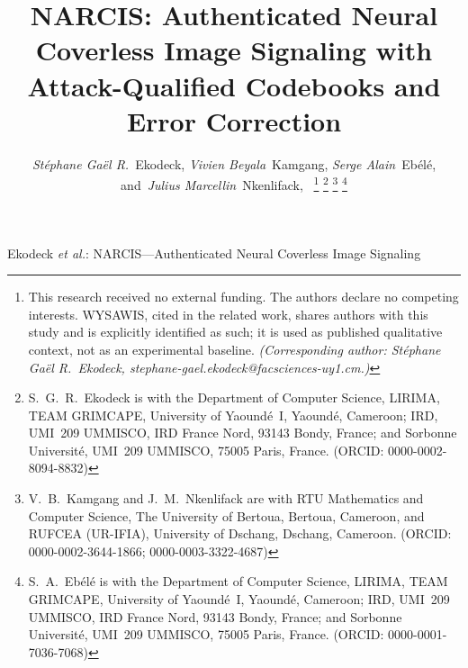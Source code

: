 ﻿\documentclass[10pt,journal]{IEEEtran}
\begin{document}
\title{NARCIS: Authenticated Neural Coverless Image Signaling
  with Attack-Qualified Codebooks and Error Correction}

\author{\emph{St\'{e}phane Ga\"{e}l R.}~Ekodeck,
        \emph{Vivien Beyala}~Kamgang,
        \emph{Serge Alain}~Eb\'{e}l\'{e},
        and~\emph{Julius Marcellin}~Nkenlifack,~
\thanks{This research received no external funding. The authors declare no
  competing interests. WYSAWIS, cited in the related work, shares authors
  with this study and is explicitly identified as such; it is used as
  published qualitative context, not as an experimental baseline.
  \emph{(Corresponding author: St\'ephane Ga\"el R.~Ekodeck,
  stephane-gael.ekodeck@facsciences-uy1.cm.)}}
\thanks{S.~G.~R.~Ekodeck is with the Department of Computer Science,
  LIRIMA, TEAM GRIMCAPE, University of Yaound\'e~I, Yaound\'e, Cameroon;
  IRD, UMI~209 UMMISCO, IRD France Nord, 93143 Bondy, France; and
  Sorbonne Universit\'e, UMI~209 UMMISCO, 75005 Paris, France.
  (ORCID: 0000-0002-8094-8832)}
\thanks{V.~B.~Kamgang and J.~M.~Nkenlifack are with RTU Mathematics and
  Computer Science, The University of Bertoua, Bertoua, Cameroon, and
  RUFCEA (UR-IFIA), University of Dschang, Dschang, Cameroon.
  (ORCID: 0000-0002-3644-1866; 0000-0003-3322-4687)}
\thanks{S.~A.~Eb\'el\'e is with the Department of Computer Science,
  LIRIMA, TEAM GRIMCAPE, University of Yaound\'e~I, Yaound\'e, Cameroon;
  IRD, UMI~209 UMMISCO, IRD France Nord, 93143 Bondy, France; and
  Sorbonne Universit\'e, UMI~209 UMMISCO, 75005 Paris, France.
  (ORCID: 0000-0001-7036-7068)}}

%
{Ekodeck \MakeLowercase{\textit{et al.}}: NARCIS---Authenticated
  Neural Coverless Image Signaling}

\maketitle
\end{document}
